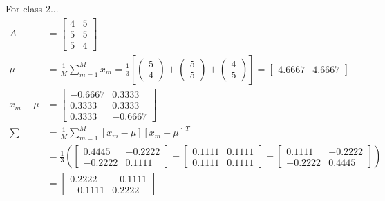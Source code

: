 \documentclass[fleqn]{article}
\begin{document}
\begin{description}
    For class 2...
    \begin{align*}
        A &= \begin{bmatrix}
                4 & 5 \\
                5 & 5 \\
                5 & 4
             \end{bmatrix} \\
        \mu &= \frac{1}{M} \sum_{m=1}^{M}{x_m} = \frac{1}{3} \left [ \begin{pmatrix}5 \\ 4\end{pmatrix} +
                                                                     \begin{pmatrix}5 \\ 5\end{pmatrix} +
                                                                     \begin{pmatrix}4 \\ 5\end{pmatrix} \right ]
                                               = \begin{bmatrix} 4.6667 & 4.6667 \end{bmatrix} \\
        x_m - \mu &= \begin{bmatrix}
                        -0.6667 &  0.3333 \\
                         0.3333 &  0.3333 \\
                         0.3333 & -0.6667
                     \end{bmatrix} \\
        \sum &= \frac{1}{M} \sum_{m=1}^{M}{\left [ x_m - \mu \right ] \left [ x_m - \mu \right ]^T} \\
             &= \frac{1}{3} \left ( \begin{bmatrix} 0.4445 & -0.2222 \\ -0.2222 & 0.1111 \end{bmatrix} +
                                    \begin{bmatrix} 0.1111 &  0.1111 \\  0.1111 & 0.1111 \end{bmatrix} +
                                    \begin{bmatrix} 0.1111 & -0.2222 \\ -0.2222 & 0.4445 \end{bmatrix} \right ) \\
             &= \begin{bmatrix} 0.2222 & -0.1111 \\ -0.1111 & 0.2222 \end{bmatrix} \\

\end{align*}
\end{description}
\end{document}
